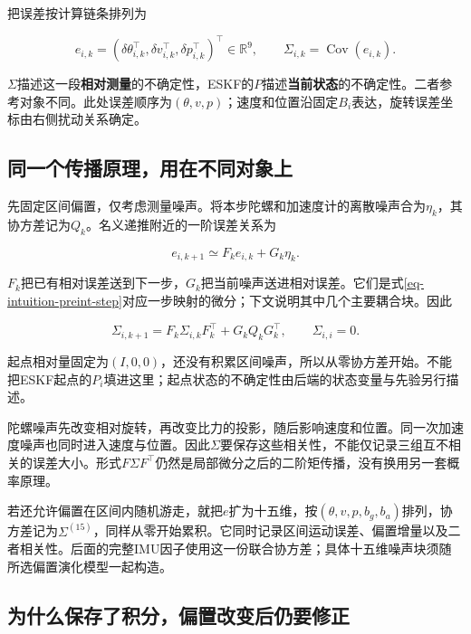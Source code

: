 把误差按计算链条排列为

\begin{equation*}
e_{i,k}=(\delta\theta_{i,k}^\top,\delta v_{i,k}^\top,
              \delta p_{i,k}^\top)^\top\in\mathbb R^9,
 \qquad\Sigma_{i,k}=\operatorname{Cov}(e_{i,k}).
\end{equation*}

$\Sigma$描述这一段\textbf{相对测量}的不确定性，ESKF的$P$描述\textbf{当前状态}的不确定性。二者参考对象不同。此处误差顺序为$(\theta,v,p)$；速度和位置沿固定$B_i$表达，旋转误差坐标由右侧扰动关系确定。

\subsection{同一个传播原理，用在不同对象上}

先固定区间偏置，仅考虑测量噪声。将本步陀螺和加速度计的离散噪声合为$\eta_k$，其协方差记为$Q_k$。名义递推附近的一阶误差关系为

\begin{equation*}
e_{i,k+1}\simeq F_ke_{i,k}+G_k\eta_k.
\end{equation*}

$F_k$把已有相对误差送到下一步，$G_k$把当前噪声送进相对误差。它们是式\eqref{eq-intuition-preint-step}对应一步映射的微分；下文说明其中几个主要耦合块。因此

\begin{equation}\label{eq-intuition-sigma}
\boxed{\Sigma_{i,k+1}=F_k\Sigma_{i,k}F_k^\top+G_kQ_kG_k^\top,
 \qquad\Sigma_{i,i}=0.}
\end{equation}

起点相对量固定为$(I,0,0)$，还没有积累区间噪声，所以从零协方差开始。不能把ESKF起点的$P_i$填进这里；起点状态的不确定性由后端的状态变量与先验另行描述。

陀螺噪声先改变相对旋转，再改变比力的投影，随后影响速度和位置。同一次加速度噪声也同时进入速度与位置。因此$\Sigma$要保存这些相关性，不能仅记录三组互不相关的误差大小。形式$F\Sigma F^\top$仍然是局部微分之后的二阶矩传播，没有换用另一套概率原理。

若还允许偏置在区间内随机游走，就把$e$扩为十五维，按$(\theta,v,p,b_g,b_a)$排列，协方差记为$\Sigma^{(15)}$，同样从零开始累积。它同时记录区间运动误差、偏置增量以及二者相关性。后面的完整IMU因子使用这一份联合协方差；具体十五维噪声块须随所选偏置演化模型一起构造。

\subsection{为什么保存了积分，偏置改变后仍要修正}

